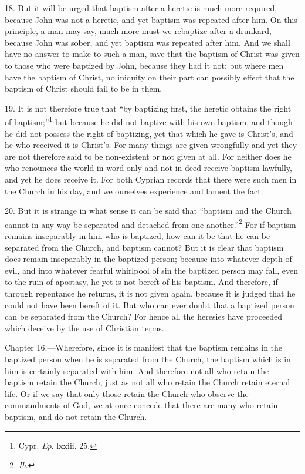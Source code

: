 18. But it will be urged that baptism after a heretic is much more required, because John was not a heretic, and yet baptism was repeated after him. On this principle, a man may say, much more must we rebaptize after a drunkard, because John was sober, and yet baptism was repeated after him. And we shall have no answer to make to such a man, save that the baptism of Christ was given to those who were baptized by John, because they had it not; but where men have the baptism of Christ, no iniquity on their part can possibly effect that the baptism of Christ should fail to be in them.

19. It is not therefore true that ``by baptizing first, the heretic obtains the right of baptism;''\footnote{\par  Cypr. \emph{Ep}. lxxiii. 25.} but because he did not baptize with his own baptism, and though he did not possess the right of baptizing, yet that which he gave is Christ’s, and he who received it is Christ’s. For many things are given wrongfully and yet they are not therefore said to be non-existent or not given at all. For neither does he who renounces the world in word only and not in deed receive baptism lawfully, and yet he does receive it. For both Cyprian records that there were such men in the Church in his day, and we ourselves experience and lament the fact.

20. But it is strange in what sense it can be said that ``baptism and the Church cannot in any way be separated and detached from one another.''\footnote{\par  \emph{Ib}.} For if baptism remains inseparably in him who is baptized, how can it be that he can be separated from the Church, and baptism cannot? But it is clear that baptism does remain inseparably in the baptized person; because into whatever depth of evil, and into whatever fearful whirlpool of sin the baptized person may fall, even to the ruin of apostasy, he yet is not bereft of his baptism. And therefore, if through repentance he returns, it is not given again, because it is judged that he could not have been bereft of it. But who can ever doubt that a baptized person can be separated from the Church? For hence all the heresies have proceeded which deceive by the use of Christian terms.


Chapter 16.—Wherefore, since it is manifest that the baptism remains in the baptized person when he is separated from the Church, the baptism which is in him is certainly separated with him. And therefore not all who retain the baptism retain the Church, just as not all who retain the Church retain eternal life. Or if we say that only those retain the Church who observe the commandments of God, we at once concede that there are many who retain baptism, and do not retain the Church.

